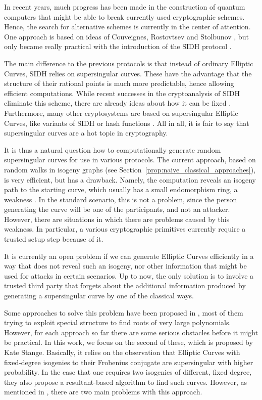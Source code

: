 
In recent years, much progress has been made in the construction of quantum computers that might be able to break currently used cryptographic schemes.
Hence, the search for alternative schemes is currently in the center of attention.
One approach is based on ideas of Couveignes, Rostovtsev and Stolbunov \cite{old_isogeny_crypto1, old_isogeny_crypto2, old_isogeny_crypto3}, but only became really practical with the introduction of the SIDH protocol \cite{sidh}.

The main difference to the previous protocols is that instead of ordinary Elliptic Curves, SIDH relies on supersingular curves.
These have the advantage that the structure of their rational points is much more predictable, hence allowing efficient computations.
While recent successes in the cryptoanalysis of SIDH \cite{sidh_broken} eliminate this scheme, there are already ideas about how it can be fixed \cite{sidh_fix1,sidh_fix2}.
Furthermore, many other cryptosystems are based on supersingular Elliptic Curves, like variants of SIDH \cite{csidh, osidh} or hash functions \cite{supersingular_hash_function}.
All in all, it is fair to say that supersingular curves are a hot topic in cryptography.

It is thus a natural question how to computationally generate random supersingular curves for use in various protocols.
The current approach, based on random walks in isogeny graphs (see Section~\ref{prop:naive_classical_approaches}), is very efficient, but has a drawback.
Namely, the computation reveals an isogeny path to the starting curve, which usually has a small endomorphism ring, a weakness \cite{endomorphism_ring_isogeny_path_equivalent}.
In the standard scenario, this is not a problem, since the person generating the curve will be one of the participants, and not an attacker.
However, there are situations in which there are problems caused by this weakness.
In particular, a various cryptographic primitives \cite{torsion_point_problem1, torsion_point_problem2} currently require a trusted setup step because of it.

It is currently an open problem if we can generate Elliptic Curves efficiently in a way that does not reveal such an isogeny, nor other information that might be used for attacks in certain scenarios.
Up to now, the only solution is to involve a trusted third party that forgets about the additional information produced by generating a supersingular curve by one of the classical ways.

Some approaches to solve this problem have been proposed in \cite{base_paper}, most of them trying to exploit special structure to find roots of very large polynomials.
However, for each approach so far there are some serious obstacles before it might be practical.
In this work, we focus on the second of these, which is proposed by Kate Stange.
Basically, it relies on the observation that Elliptic Curves with fixed-degree isogenies to their Frobenius conjugate are supersingular with higher probability.
In the case that one requires two isogenies of different, fixed degree, they also propose a resultant-based algorithm to find such curves.
However, as mentioned in \cite{base_paper}, there are two main problems with this approach.

